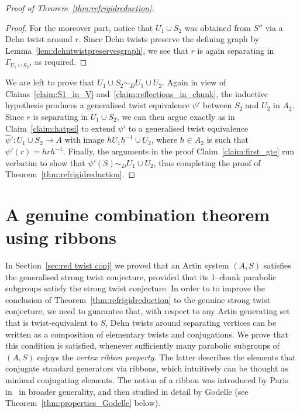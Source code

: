 \documentclass[svgnames]{amsart}
\theoremstyle{plain}
\theoremstyle{definition}
\newenvironment{claimproof}{\renewcommand{\qedsymbol}{$\blacksquare$}\begin{proof}}{\end{proof}}
\begin{document}
\begin{proof}[Proof of Theorem~\ref{thm:refrigidreduction}]
\begin{claimproof}
    For the moreover part, notice that $U_1 \cup S_2$ was obtained from $S''$ via a Dehn twist around $r$. Since Dehn twists preserve the defining graph by Lemma~\ref{lem:dehntwistpreservesgraph}, we see that $r$ is again separating in $\Gamma_{U_1 \cup S_2}$, as required.
    \end{claimproof}

    \noindent We are left to prove that $U_1 \cup S_2\sim_D U_1\cup U_2$. Again in view of Claims~\ref{claim:S1_in_V} and~\ref{claim:reflections_in_chunk}, the inductive hypothesis produces a generalised twist equivalence $\psi'$ between $S_2$ and $U_2$ in $A_2$. Since $r$ is separating in $U_1 \cup S_2$, we can then argue exactly as in Claim~\ref{claim:hatpsi} to extend $\psi'$ to a generalised twist equivalence $\hat\psi'\colon U_1 \cup S_2\to A$ with image $hU_1h^{-1}\cup U_2$, where $h\in A_2$ is such that $\psi'(r)=hrh^{-1}$. Finally, the arguments in the proof Claim~\ref{claim:first_gte} run verbatim to show that $\psi'(S)\sim_D U_1\cup U_2$, thus  completing the proof of Theorem~\ref{thm:refrigidreduction}. 
\end{proof}


\section{A genuine combination theorem using ribbons}\label{sec:strongtwist_for_some}
In Section~\ref{sec:red twist conj} we proved that an Artin system $(A,S)$ satisfies the generalised strong twist conjecture, provided that its 1--chunk parabolic subgroups satisfy the strong twist conjecture. In order to to improve the conclusion of Theorem~\ref{thm:refrigidreduction} to the genuine strong twist conjecture, we need to guarantee that, with respect to any Artin generating set that is twist-equivalent to $S$, Dehn twists around separating vertices can be written as a composition of elementary twists and conjugations. We prove that this condition is satisfied, whenever sufficiently many parabolic subgroups of $(A,S)$ enjoys the \emph{vertex ribbon property}. The latter describes the elements that conjugate standard generators via ribbons, which intuitively can be thought as minimal conjugating elements. The notion of a ribbon was introduced by Paris in~\cite{Pparabolics} in broader generality, and then studied in detail by Godelle (see Theorem~\ref{thm:properties_Godelle} below).
\end{document}
